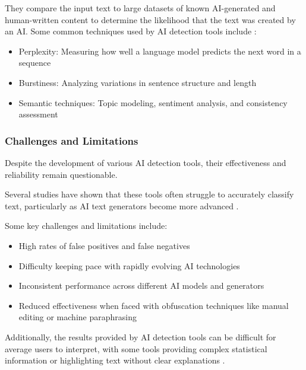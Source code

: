 \documentclass{article}
\begin{document}
They compare the input text to large datasets of known AI-generated
and human-written content to determine the likelihood that the text
was created by an AI.
Some common techniques used by AI detection tools include
\cite{surferseo_ai_content_detectors}
\cite{contadu_ai_detection}:

\begin{itemize}
    \item Perplexity: Measuring how well a language model predicts the next word in a sequence
    \item Burstiness: Analyzing variations in sentence structure and length
    \item Semantic techniques: Topic modeling, sentiment analysis, and consistency assessment
\end{itemize}
\subsubsection{Challenges and Limitations}
Despite the development of various AI detection tools,
their effectiveness and reliability remain questionable.

Several studies have shown that these tools often struggle to accurately classify text,
particularly as AI text generators become more advanced
\cite{scribbr_ai_detectors}
\cite{contadu_ai_detection}
\cite{biomedcentral_ai_detection}.

Some key challenges and limitations include:
\begin{itemize}
    \item High rates of false positives and false negatives \cite{scribbr_ai_detectors} \cite{biomedcentral_ai_detection} \cite{kb_iu_chatgpt}
    \item Difficulty keeping pace with rapidly evolving AI technologies \cite{surferseo_ai_content_detectors} \cite{contadu_ai_detection}
    \item Inconsistent performance across different AI models and generators \cite{biomedcentral_ai_detection}
    \item Reduced effectiveness when faced with obfuscation techniques like manual editing or machine paraphrasing \cite{biomedcentral_ai_detection_variation}
\end{itemize}
Additionally, the results provided by AI detection tools can be difficult
for average users to interpret, with some tools providing complex statistical
information or highlighting text without clear explanations
\cite{biomedcentral_ai_detection_variation}.
\end{document}
